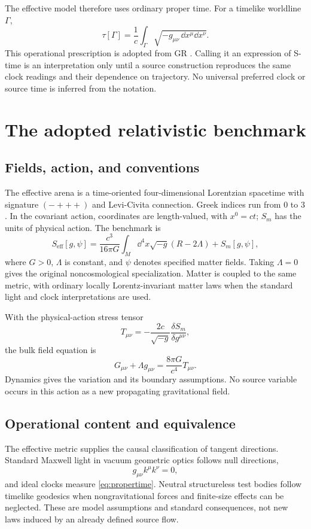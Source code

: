\documentclass[11pt]{article}
\begin{document}
The effective model therefore uses ordinary proper time. For a timelike worldline $\Gamma$,
\begin{equation}
\tau[\Gamma]=\frac{1}{c}\int_\Gamma
\sqrt{-g_{\mu\nu}\,\dd x^\mu\dd x^\nu}.
\label{eq:propertime}
\end{equation}
This operational prescription is adopted from GR \parencite{Carroll1997}. Calling it an expression of S-time is an interpretation only until a source construction reproduces the same clock readings and their dependence on trajectory. No universal preferred clock or source time is inferred from the notation.

\section{The adopted relativistic benchmark}
\subsection{Fields, action, and conventions}
The effective arena is a time-oriented four-dimensional Lorentzian spacetime with signature $(-+++)$ and Levi-Civita connection. Greek indices run from $0$ to $3$. In the covariant action, coordinates are length-valued, with $x^0=ct$; $S_m$ has the units of physical action. The benchmark is
\begin{equation}
S_{\mathrm{eff}}[g,\psi]=\frac{c^3}{16\pi G}
\int_M\dd^4x\sqrt{-g}(R-2\Lambda)+S_m[g,\psi],
\label{eq:SA}
\end{equation}
where $G>0$, $\Lambda$ is constant, and $\psi$ denotes specified matter fields. Taking $\Lambda=0$ gives the original noncosmological specialization. Matter is coupled to the same metric, with ordinary locally Lorentz-invariant matter laws when the standard light and clock interpretations are used.

With the physical-action stress tensor
\begin{equation}
T_{\mu\nu}=-\frac{2c}{\sqrt{-g}}\frac{\delta S_m}{\delta g^{\mu\nu}},
\end{equation}
the bulk field equation is
\begin{equation}
G_{\mu\nu}+\Lambda g_{\mu\nu}=\frac{8\pi G}{c^4}T_{\mu\nu}.
\label{eq:einstein}
\end{equation}
Dynamics gives the variation and its boundary assumptions. No source variable occurs in this action as a new propagating gravitational field.

\subsection{Operational content and equivalence}
The effective metric supplies the causal classification of tangent directions. Standard Maxwell light in vacuum geometric optics follows null directions,
\begin{equation}
g_{\mu\nu}k^\mu k^\nu=0,
\label{eq:null}
\end{equation}
and ideal clocks measure \eqref{eq:propertime}. Neutral structureless test bodies follow timelike geodesics when nongravitational forces and finite-size effects can be neglected. These are model assumptions and standard consequences, not new laws induced by an already defined source flow.
\end{document}
